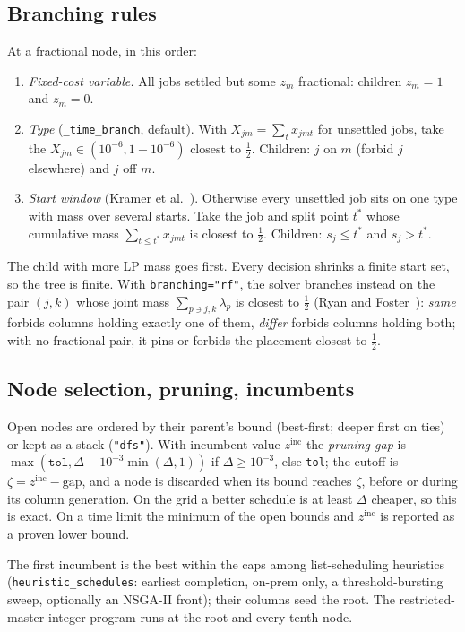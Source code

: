 \documentclass[11pt,a4paper]{article}
\theoremstyle{definition}
\theoremstyle{remark}
\newcommand{\code}[1]{\texttt{#1}}
\begin{document}
\subsection{Branching rules}
At a fractional node, in this order:
\begin{enumerate}[leftmargin=*]
\item \emph{Fixed-cost variable.} All jobs settled but some $z_m$ fractional:
  children $z_m=1$ and $z_m=0$.
\item \emph{Type} (\code{\_time\_branch}, default). With
  $X_{jm}=\sum_tx_{jmt}$ for unsettled jobs, take the $X_{jm}\in(10^{-6},1-10^{-6})$
  closest to $\tfrac12$. Children: $j$ on $m$ (forbid $j$ elsewhere) and $j$
  off $m$.
\item \emph{Start window} (Kramer et al.~\cite{kramer2020}). Otherwise every
  unsettled job sits on one type with mass over several starts. Take the job
  and split point $t^\ast$ whose cumulative mass $\sum_{t\le t^\ast}x_{jmt}$ is
  closest to $\tfrac12$. Children: $s_j\le t^\ast$ and $s_j>t^\ast$.
\end{enumerate}
The child with more LP mass goes first. Every decision shrinks a finite start
set, so the tree is finite. With \code{branching="rf"}, the solver branches
instead on the pair $(j,k)$ whose joint mass $\sum_{p\ni j,k}\lambda_p$ is
closest to $\tfrac12$ (Ryan and Foster~\cite{ryan1981}): \emph{same} forbids
columns holding exactly one of them, \emph{differ} forbids columns holding
both; with no fractional pair, it pins or forbids the placement closest to
$\tfrac12$.

\subsection{Node selection, pruning, incumbents}
Open nodes are ordered by their parent's bound (best-first; deeper first on
ties) or kept as a stack (\code{"dfs"}). With incumbent value $z^{\mathrm{inc}}$
the \emph{pruning gap} is $\max(\texttt{tol},\Delta-10^{-3}\min(\Delta,1))$ if
$\Delta\ge10^{-3}$, else \texttt{tol}; the cutoff is
$\zeta=z^{\mathrm{inc}}-\text{gap}$, and a node is discarded when its bound
reaches $\zeta$, before or during its column generation. On the grid a better
schedule is at least $\Delta$ cheaper, so this is exact. On a time limit the
minimum of the open bounds and $z^{\mathrm{inc}}$ is reported as a proven lower
bound.

The first incumbent is the best within the caps among list-scheduling
heuristics (\code{heuristic\_schedules}: earliest completion, on-prem only, a
threshold-bursting sweep, optionally an NSGA-II front); their columns seed the
root. The restricted-master integer program runs at the root and every tenth
node.
\end{document}
